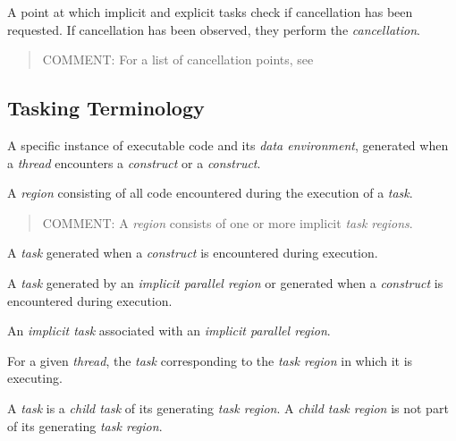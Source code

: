 \glossarydefstart
A point at which implicit and explicit tasks check if cancellation has been 
requested. If cancellation has been observed, they perform the \emph{cancellation}. 

\begin{quote}
COMMENT: For a list of cancellation points, see 
\end{quote}
\glossarydefend
\bigskip







\subsection{Tasking Terminology}
\label{subsec:Tasking Terminology}
\glossarydefstart
A specific instance of executable code and its \emph{data environment}, generated when a 
\emph{thread} encounters a  \emph{construct} or a  \emph{construct}. 
\glossarydefend

\glossarydefstart
A \emph{region} consisting of all code encountered during the execution of a \emph{task}. 

\begin{quote}
COMMENT: A  \emph{region} consists of one or more implicit \emph{task regions}. 
\end{quote}
\glossarydefend

\glossarydefstart
A \emph{task} generated when a  \emph{construct} is encountered during execution.
\glossarydefend

\glossarydefstart
A \emph{task} generated by an \emph{implicit parallel region} or generated when a 
\emph{construct} is encountered during execution.
\glossarydefend

\glossarydefstart
An \emph{implicit task} associated with an \emph{implicit parallel region}.
\glossarydefend

\glossarydefstart
For a given \emph{thread}, the \emph{task} corresponding to the \emph{task region} in which it is 
executing.
\glossarydefend

\glossarydefstart
A \emph{task} is a \emph{child task} of its generating \emph{task region}. 
A \emph{child task region} is not part of its generating \emph{task region}.
\glossarydefend

